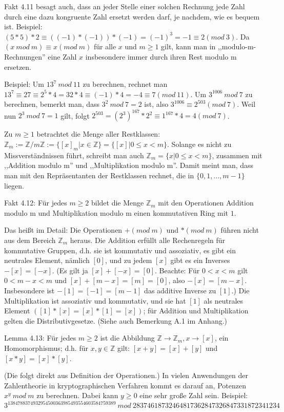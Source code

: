 \documentclass[a4paper]{article}
\begin{document}
\begin{multicols}{3}
    Fakt 4.11 besagt auch, dass an jeder Stelle einer solchen Rechnung jede Zahl durch eine dazu kongruente Zahl ersetzt werden darf, je nachdem, wie es bequem ist. Beispiel: $(5*5)* 2 \equiv((-1)*(-1))*(-1) = (-1)^3 =- 1 \equiv 2 (mod\ 3)$. Da $(x\ mod\ m)\equiv x(mod\ m)$ für alle $x$ und $m\geq 1$ gilt, kann man in ,,modulo-m-Rechnungen'' eine Zahl $x$ insbesondere immer durch ihren Rest modulo m ersetzen.

    Beispiel: Um $13^7\ mod\ 11$ zu berechnen, rechnet man $13^7\equiv 27\equiv 2^5*4 =32* 4\equiv (-1)*4 = -4\equiv 7(mod\ 11)$. Um $3^{1006}\ mod\ 7$ zu berechnen, bemerkt man, dass $3^2\ mod\ 7=2$ ist, also $3^{1006}\equiv 2^{503}(mod\ 7)$. Weil nun $2^3\ mod\ 7=1$ gilt, folgt $2^{503}=(2^3)^{167} * 2^2 \equiv 1^{167}*4=4(mod\ 7)$.

    Zu $m\geq 1$ betrachtet die Menge aller Restklassen: $\mathbb{Z}_m:=\mathbb{Z}/m\mathbb{Z}:=\{[x]_m|x\in\mathbb{Z}\}=\{[x]| 0 \leq x<m\}$. Solange es nicht zu Missverständnissen führt, schreibt man auch $\mathbb{Z}_m=\{x|0 \leq x < m\}$, zusammen mit ,,Addition modulo m'' und ,,Multiplikation modulo m''. Damit meint man, dass man mit den Repräsentanten der Restklassen rechnet, die in $\{0,1 ,...,m-1\}$ liegen.

    Fakt 4.12: Für jedes $m\geq 2$ bildet die Menge $\mathbb{Z}_m$ mit den Operationen Addition modulo m und Multiplikation modulo m einen kommutativen Ring mit $1$.

    Das heißt im Detail: Die Operationen $+(mod\ m)$ und $*(mod\ m)$ führen nicht aus dem Bereich $\mathbb{Z}_m$ heraus. Die Addition erfüllt alle Rechenregeln für kommutative Gruppen, d.h. sie ist kommutativ und assoziativ, es gibt ein neutrales Element, nämlich $[0]$, und zu jedem $[x]$ gibt es ein Inverses $-[x]=[-x]$. (Es gilt ja $[x] + [-x] = [0]$. Beachte: Für $0 < x < m$ gilt $0< m-x < m$ und $[x]+[m-x]=[m]=[0]$, also $-[x]=[m-x]$. Insbesondere ist $-[1]=[-1]=[m-1]$ das additive Inverse zu $[1]$.) Die Multiplikation ist assoziativ und kommutativ, und sie hat $[1]$ als neutrales Element $([1]*[x] = [x]*[1] = [x])$; für Addition und Multiplikation gelten die Distributivgesetze. (Siehe auch Bemerkung A.1 im Anhang.)

    Lemma 4.13: Für jedes $m\geq 2$ ist die Abbildung $\mathbb{Z}\rightarrow\mathbb{Z}_m ,x\rightarrow [x]$, ein Homomorphismus; d.h. für $x,y\in\mathbb{Z}$ gilt: $[x+y]=[x]+[y]$ und $[x*y] = [x]*[y]$.

    (Die folgt direkt aus Definition der Operationen.)
    In vielen Anwendungen der Zahlentheorie in kryptographischen Verfahren kommt es darauf an, Potenzen $x^y\ mod\ m$ zu berechnen. Dabei kann $y\geq 0$ eine sehr große Zahl sein. Beispiel: $3^{1384788374932954500363985493554603584759389}\ mod\ 28374618732464817362847326847331872341234$


\end{multicols}
\end{document}
